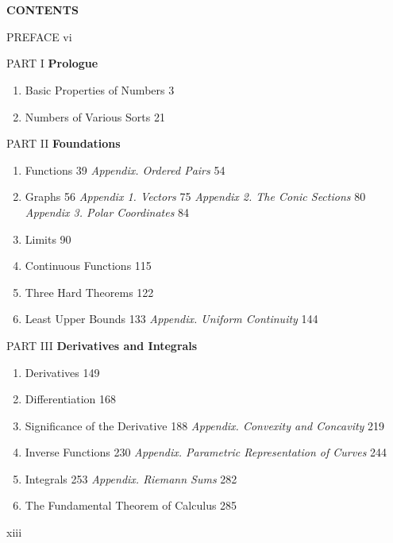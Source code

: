 \section*{}
\begin{center}
\textbf{\Large CONTENTS}
\end{center}
\bigskip
PREFACE \hfill vi

PART I \hfill \textbf{Prologue}
\begin{enumerate}
    \item Basic Properties of Numbers \hfill 3
    \item Numbers of Various Sorts \hfill 21
\end{enumerate}

PART II \hfill \textbf{Foundations}
\begin{enumerate}
    \item Functions \hfill 39
    \textit{Appendix. Ordered Pairs} \hfill 54
    \item Graphs \hfill 56
    \textit{Appendix 1. Vectors} \hfill 75
    \textit{Appendix 2. The Conic Sections} \hfill 80
    \textit{Appendix 3. Polar Coordinates} \hfill 84
    \item Limits \hfill 90
    \item Continuous Functions \hfill 115
    \item Three Hard Theorems \hfill 122
    \item Least Upper Bounds \hfill 133
    \textit{Appendix. Uniform Continuity} \hfill 144
\end{enumerate}

PART III \hfill \textbf{Derivatives and Integrals}
\begin{enumerate}
    \item Derivatives \hfill 149
    \item Differentiation \hfill 168
    \item Significance of the Derivative \hfill 188
    \textit{Appendix. Convexity and Concavity} \hfill 219
    \item Inverse Functions \hfill 230
    \textit{Appendix. Parametric Representation of Curves} \hfill 244
    \item Integrals \hfill 253
    \textit{Appendix. Riemann Sums} \hfill 282
    \item The Fundamental Theorem of Calculus \hfill 285
\end{enumerate}
\hfill xiii